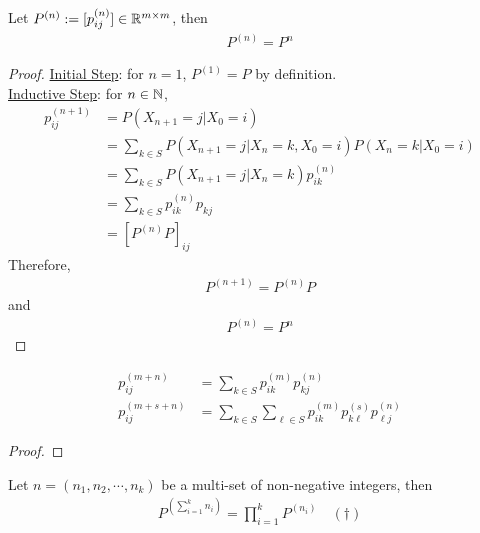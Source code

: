 \documentclass{article}
\begin{document}
    \begin{proposition}
    Let $P^{(n)} := [p_{ij}^{(n)}] \in \mathbb{R}^{m \times m}$, then
    	\begin{align}
    		P^{(n)} = P^n
    	\end{align}
    \end{proposition}
    \begin{proof}
    	\ul{Initial Step}: for $n = 1$, $P^{(1)} = P$ by definition. \\
    	\ul{Inductive Step}: for $n \in \mathbb{N}$,
    	\begin{align}
    		p_{ij}^{(n+1)} &= P(X_{n+1}=j|X_0=i) \\
    		&= \sum_{k \in S} P(X_{n+1}=j|X_n = k, X_0=i) P(X_n=k|X_0=i) \\
    		&= \sum_{k \in S} P(X_{n+1}=j|X_n = k) p_{ik}^{(n)} \\
    		&= \sum_{k \in S} p_{ik}^{(n)} p_{kj} \\
    		&= [P^{(n)} P]_{ij}
    	\end{align}
    	Therefore,
    	\begin{align}
    		P^{(n+1)} = P^{(n)} P
    	\end{align}
    	and 
    	\begin{align}
    		P^{(n)} = P^n
    	\end{align}
    \end{proof}
    
    \begin{theorem}
    	\begin{align}
    		p_{i j}^{(m+n)} &=\sum_{k \in S} p_{i k}^{(m)} p_{k j}^{(n)} \\
    		p_{i j}^{(m+s+n)}&=\sum_{k \in S} \sum_{\ell \in S} p_{i k}^{(m)} p_{k \ell}^{(s)} p_{\ell j}^{(n)}
    	\end{align}
    \end{theorem}

	\begin{proof}
		\todo{}
	\end{proof}
    
    \begin{theorem}
    	Let $n = (n_1, n_2, \cdots, n_k)$ be a multi-set of non-negative integers, then
    	\begin{align}
    		P^{(\sum_{i=1}^k n_i)} = \prod_{i=1}^k P^{(n_i)}\quad (\dagger)
    	\end{align}
    \end{theorem}
    
\end{document}
